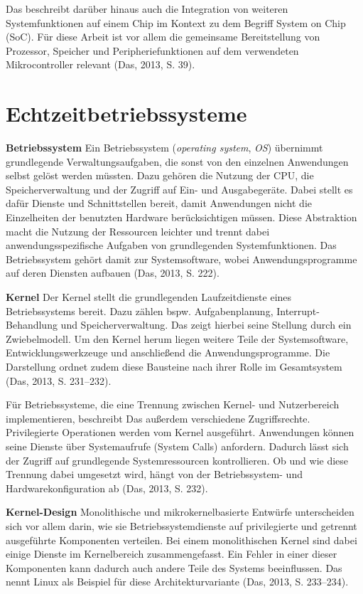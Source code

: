 Das beschreibt dar{\"u}ber hinaus auch die Integration von weiteren Systemfunktionen auf einem Chip im Kontext zu dem Begriff \glqq{}System on Chip\grqq{} (SoC). F{\"u}r diese Arbeit ist vor allem die gemeinsame Bereitstellung von Prozessor, Speicher und Peripheriefunktionen auf dem verwendeten Mikrocontroller relevant (Das, 2013, S. 39).

\section{Echtzeitbetriebssysteme}
\textbf{Betriebssystem }Ein Betriebssystem (\emph{operating system}, \emph{OS}) {\"u}bernimmt grundlegende Verwaltungsaufgaben, die sonst von den einzelnen Anwendungen selbst gel{\"o}st werden m{\"u}ssten. Dazu geh{\"o}ren die Nutzung der CPU, die Speicherverwaltung und der Zugriff auf Ein- und Ausgabeger{\"a}te. Dabei stellt es daf{\"u}r Dienste und Schnittstellen bereit, damit Anwendungen nicht die Einzelheiten der benutzten Hardware ber{\"u}cksichtigen m{\"u}ssen. Diese Abstraktion macht die Nutzung der Ressourcen leichter und trennt dabei anwendungsspezifische Aufgaben von grundlegenden Systemfunktionen. Das Betriebssystem geh{\"o}rt damit zur Systemsoftware, wobei Anwendungsprogramme auf deren Diensten aufbauen (Das, 2013, S. 222).

\textbf{Kernel} Der Kernel stellt die grundlegenden Laufzeitdienste eines Betriebssystems bereit. Dazu z{\"a}hlen bspw. Aufgabenplanung, Interrupt-Behandlung und Speicherverwaltung. Das zeigt hierbei seine Stellung durch ein Zwiebelmodell. Um den Kernel herum liegen weitere Teile der Systemsoftware, Entwicklungswerkzeuge und anschlie{\ss}end die Anwendungsprogramme. Die Darstellung ordnet zudem diese Bausteine nach ihrer Rolle im Gesamtsystem (Das, 2013, S. 231--232).

F{\"u}r Betriebssysteme, die eine Trennung zwischen Kernel- und Nutzerbereich implementieren, beschreibt Das au{\ss}erdem verschiedene Zugriffsrechte. Privilegierte Operationen werden vom Kernel ausgef{\"u}hrt. Anwendungen k{\"o}nnen seine Dienste {\"u}ber Systemaufrufe (System Calls) anfordern. Dadurch l{\"a}sst sich der Zugriff auf grundlegende Systemressourcen kontrollieren. Ob und wie diese Trennung dabei umgesetzt wird, h{\"a}ngt von der Betriebssystem- und Hardwarekonfiguration ab (Das, 2013, S. 232).

\textbf{Kernel-Design }Monolithische und mikrokernelbasierte Entw{\"u}rfe unterscheiden sich vor allem darin, wie sie Betriebssystemdienste auf privilegierte und getrennt ausgef{\"u}hrte Komponenten verteilen. Bei einem monolithischen Kernel sind dabei einige Dienste im Kernelbereich zusammengefasst. Ein Fehler in einer dieser Komponenten kann dadurch auch andere Teile des Systems beeinflussen. Das nennt Linux als Beispiel f{\"u}r diese Architekturvariante (Das, 2013, S. 233--234).

